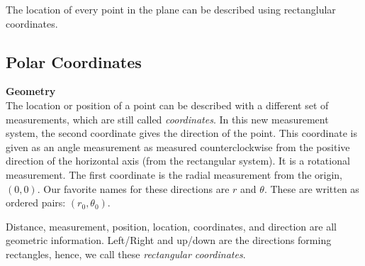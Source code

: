 \documentclass{ximera}
\begin{document}
\qquad

The location of every point in the plane can be described using rectanglular coordinates.








\subsection*{Polar Coordinates}

\textbf{\textcolor{purple!85!blue}{Geometry}} \\



The location or position of a point can be described with a different set of measurements, which are still called \textit{coordinates}.  In this new measurement system, the second coordinate gives the direction of the point. This coordinate is given as an angle measurement as measured counterclockwise from the positive direction of the horizontal axis (from the rectangular system). It is a rotational measurement.  The first coordinate is the radial measurement from the origin, $(0,0)$. Our favorite names for these directions are $r$ and $\theta$. These are written as ordered pairs: $(r_0, \theta_0)$.


Distance, measurement, position, location, coordinates, and direction are all geometric information.  Left/Right and up/down are the directions forming rectangles, hence, we call these \textit{rectangular coordinates}.
\end{document}
